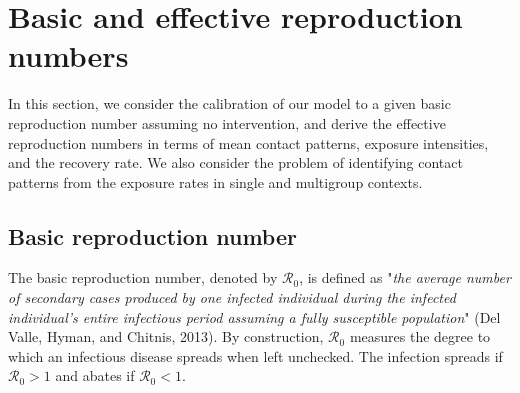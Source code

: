 \documentclass[12pt]{article}
\begin{document}
\section{Basic and effective reproduction numbers \label{Sec: calibration R}}

In this section, we consider the calibration of our model to a given basic
reproduction number assuming no intervention, and derive the effective
reproduction numbers in terms of mean contact patterns, exposure intensities,
and the recovery rate. We also consider the problem of identifying contact
patterns from the exposure rates in single and multigroup contexts.

\subsection{Basic reproduction number}

The basic reproduction number, denoted by $\mathcal{R}_{0}$, is defined as
"\textit{the average number of secondary cases produced by one infected
individual during the infected individual's entire infectious period assuming
a fully susceptible population}" (Del Valle, Hyman, and Chitnis, 2013). By
construction, $\mathcal{R}_{0}$ measures the degree to which an infectious
disease spreads when left unchecked. The infection spreads if $\mathcal{R}%
_{0}>1$ and abates if $\mathcal{R}_{0}<1$.
\end{document}
